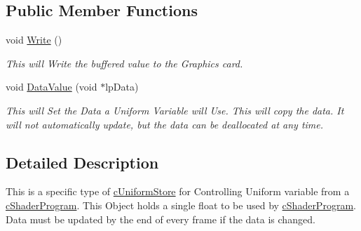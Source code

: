 \subsection*{Public Member Functions}
\begin{DoxyCompactItemize}
\item 
\hypertarget{classc_uniform_vector1_ad586955f6d37a7235aa19b55817f2cff}{
void \hyperlink{classc_uniform_vector1_ad586955f6d37a7235aa19b55817f2cff}{Write} ()}
\label{classc_uniform_vector1_ad586955f6d37a7235aa19b55817f2cff}

\begin{DoxyCompactList}\small\item\em This will Write the buffered value to the Graphics card. \end{DoxyCompactList}\item 
\hypertarget{classc_uniform_vector1_afe1a67ea45eff92a679857c74a460988}{
void \hyperlink{classc_uniform_vector1_afe1a67ea45eff92a679857c74a460988}{DataValue} (void $\ast$lpData)}
\label{classc_uniform_vector1_afe1a67ea45eff92a679857c74a460988}

\begin{DoxyCompactList}\small\item\em This will Set the Data a Uniform Variable will Use. This will copy the data. It will not automatically update, but the data can be deallocated at any time. \end{DoxyCompactList}\end{DoxyCompactItemize}


\subsection{Detailed Description}
This is a specific type of \hyperlink{classc_uniform_store}{cUniformStore} for Controlling Uniform variable from a \hyperlink{classc_shader_program}{cShaderProgram}. This Object holds a single float to be used by \hyperlink{classc_shader_program}{cShaderProgram}. Data must be updated by the end of every frame if the data is changed. 